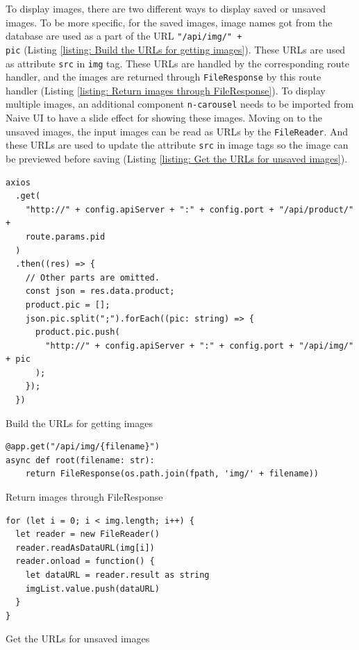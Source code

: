 \documentclass{article}
\begin{document}
To display images, there are two different ways to display saved or unsaved images. To be more specific, for the saved images, image names got from the database are used as a part of the URL \verb|"/api/img/" + |\\\verb|pic| (Listing \ref{listing: Build the URLs for getting images}). These URLs are used as attribute \verb|src| in \verb|img| tag. These URLs are handled by the corresponding route handler, and the images are returned through \verb|FileResponse| by this route handler (Listing \ref{listing: Return images through FileResponse}). To display multiple images, an additional component \verb|n-carousel| needs to be imported from Naive UI to have a slide effect for showing these images. Moving on to the unsaved images, the input images can be read as URLs by the \verb|FileReader|. And these URLs are used to update the attribute \verb|src| in image tags so the image can be previewed before saving (Listing \ref{listing: Get the URLs for unsaved images}). 
\begin{listing}[!htp]
\begin{verbatim}
axios
  .get(
    "http://" + config.apiServer + ":" + config.port + "/api/product/" + 
    route.params.pid
  )
  .then((res) => {
    // Other parts are omitted.
    const json = res.data.product;
    product.pic = [];
    json.pic.split(";").forEach((pic: string) => {
      product.pic.push(
        "http://" + config.apiServer + ":" + config.port + "/api/img/" + pic
      );
    });
  })
\end{verbatim}
\caption{Build the URLs for getting images}
\label{listing: Build the URLs for getting images}
\end{listing}
\begin{listing}[!htp]
\begin{verbatim}
@app.get("/api/img/{filename}")
async def root(filename: str):
    return FileResponse(os.path.join(fpath, 'img/' + filename))
\end{verbatim}
\caption{Return images through FileResponse}
\label{listing: Return images through FileResponse}
\end{listing}
\begin{listing}[!htp]
\begin{verbatim}
for (let i = 0; i < img.length; i++) {
  let reader = new FileReader()
  reader.readAsDataURL(img[i])
  reader.onload = function() {
    let dataURL = reader.result as string
    imgList.value.push(dataURL)
  }
}
\end{verbatim}
\caption{Get the URLs for unsaved images}
\label{listing: Get the URLs for unsaved images}
\end{listing}
\end{document}
